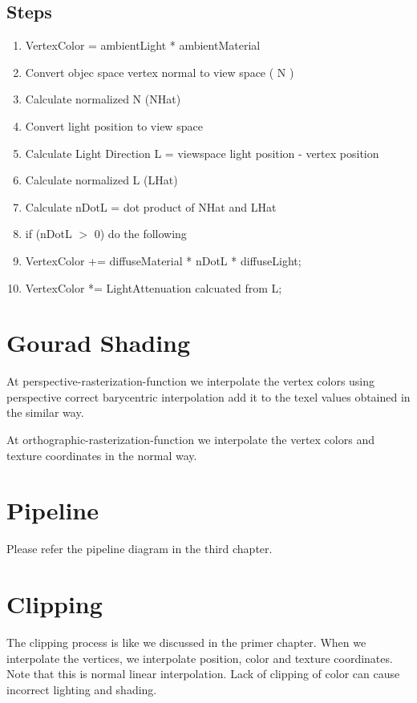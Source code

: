 \subsection{Steps}
\begin{enumerate}
    \item VertexColor = ambientLight * ambientMaterial
    \item Convert objec space vertex normal to view space ( N )
    \item Calculate normalized N (NHat)
    \item Convert light position to view space 
    \item Calculate Light Direction L = viewspace light position - vertex position
	\item Calculate normalized L (LHat)
	\item Calculate nDotL = dot product of NHat and LHat
	\item if (nDotL $>$ 0) do the following
	\item VertexColor += diffuseMaterial * nDotL * diffuseLight;
	\item VertexColor *= LightAttenuation calcuated from L; 
\end{enumerate}
\section{Gourad Shading}
At perspective-rasterization-function we interpolate the vertex colors using perspective correct barycentric interpolation add it to the texel values obtained in the similar way. 

At orthographic-rasterization-function we interpolate the vertex colors and texture coordinates in the normal way.
\section{Pipeline}
Please refer the pipeline diagram in the third chapter.
\section{Clipping}
The clipping process is like we discussed in the primer chapter. When we interpolate the vertices,  we interpolate position, color and texture coordinates. Note that this is normal linear interpolation. Lack of clipping of color can cause incorrect lighting and shading.
\clearpage




